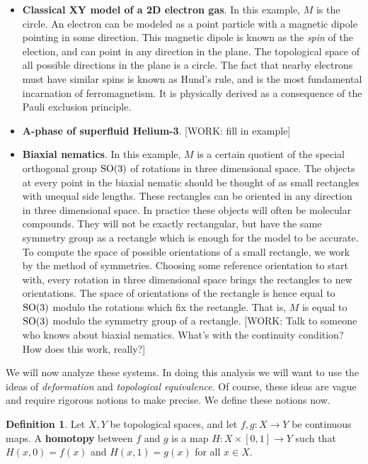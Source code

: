 \documentclass{article}
\theoremstyle{definition}
\newtheorem*{definition}{Definition}
\numberwithin{figure}{section}
\begin{document}
\begin{itemize}
\item \textbf{Classical XY model of a 2D electron gas}. In this example, $M$ is the circle. An electron can be modeled as a point particle with a magnetic dipole pointing in some direction. This magnetic dipole is known as the \textit{spin} of the election, and can point in any direction in the plane. The topological space of all possible directions in the plane is a circle. The fact that nearby electrons must have similar spins is known as Hund’s rule, and is the most fundamental incarnation of ferromagnetism. It is physically derived as a consequence of the Pauli exclusion principle.

\item \textbf{A-phase of superfluid Helium-3}.  [WORK: fill in example]

\item \textbf{Biaxial nematics}. In this example, $M$ is a certain quotient of the special orthogonal group $\mathrm{SO}(3)$ of rotations in three dimensional space. The objects at every point in the biaxial nematic should be thought of as small rectangles with unequal side lengths. These rectangles can be oriented in any direction in three dimensional space. In practice these objects will often be molecular compounds. They will not be exactly rectangular, but have the same symmetry group as a rectangle which is enough for the model to be accurate. To compute the space of possible orientations of a small rectangle, we work by the method of symmetries. Choosing some reference orientation to start with, every rotation in three dimensional space brings the rectangles to new orientations. The space of orientations of the rectangle is hence equal to $\mathrm{SO}(3)$ modulo the rotations which fix the rectangle. That is, $M$ is equal to $\mathrm{SO}(3)$ modulo the symmetry group of a rectangle. [WORK: Talk to someone who knows about biaxial nematics. What's with the continuity condition? How does this work, really?]
\end{itemize}

We will now analyze these systems. In doing this analysis we will want to use the ideas of \textit{deformation} and \textit{topological equivalence}. Of course, these ideas are vague and require rigorous notions to make precise. We define these notions now.

\begin{definition}
Let $X,Y$ be topological spaces, and let $f,g: X\to Y$ be continuous maps. A \textbf{homotopy} between $f$ and $g$ is a map $H: X\times [0,1] \to Y$ such that $H(x, 0)=f(x)$ and $H(x,1)=g(x)$ for all $x\in X$.
\end{definition}
\end{document}
